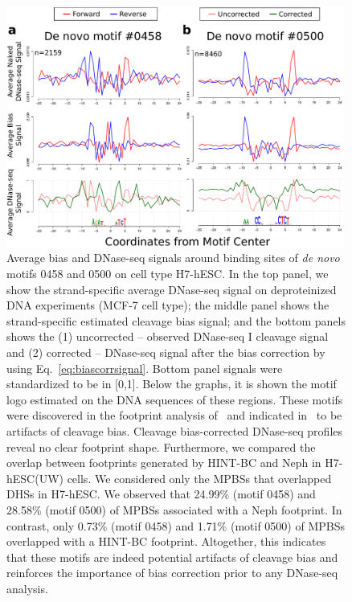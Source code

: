 \documentclass[11pt]{article}
\begin{document}
\clearpage

\begin{figure}[h!]
\centering
\includegraphics[width=0.99\textwidth]{Figs/Fig10.pdf}
\caption{Average bias and DNase-seq signals around binding sites of \emph{de novo} motifs 0458 and 0500 on cell type H7-hESC. In the top panel, we show the strand-specific average DNase-seq signal on deproteinized DNA experiments (MCF-7 cell type); the middle panel shows the strand-specific estimated cleavage bias signal; and the bottom panels shows the (1) uncorrected -- observed DNase-seq I cleavage signal and (2) corrected -- DNase-seq signal after the bias correction by using Eq.~\ref{eq:biascorrsignal}. Bottom panel signals were standardized to be in [0,1]. Below the graphs, it is shown the motif logo estimated on the DNA sequences of these regions. These motifs were discovered in the footprint analysis of~\cite{neph2012a} and indicated in~\cite{he2014} to be artifacts of cleavage bias. Cleavage bias-corrected DNase-seq profiles reveal no clear footprint shape. Furthermore, we compared the overlap between footprints generated by HINT-BC and Neph in H7-hESC(UW) cells. We considered only the MPBSs that overlapped DHSs in H7-hESC. We observed that 24.99\% (motif 0458) and 28.58\% (motif 0500) of MPBSs associated with a Neph footprint. In contrast, only 0.73\% (motif 0458) and 1.71\% (motif 0500) of MPBSs overlapped with a HINT-BC footprint. Altogether, this indicates that these motifs are indeed potential artifacts of cleavage bias and reinforces the importance of bias correction prior to any DNase-seq analysis.}
\label{fig:denovo}
\end{figure}
\end{document}
